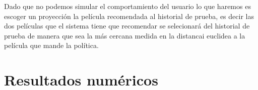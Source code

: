Dado que no podemos simular el comportamiento del usuario lo que haremos es escoger un proyección la película recomendada al historial de prueba, es decir las dos películas que el sistema tiene que recomendar se selecionará del historial de prueba de manera que sea la más cercana medida en la distancai euclidea a la película que mande la política. 

\section{Resultados numéricos}

